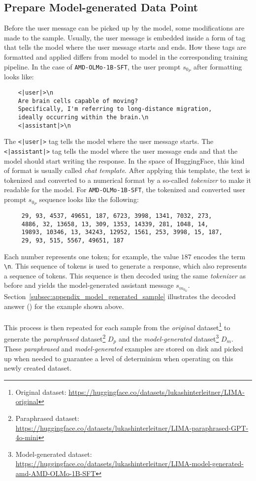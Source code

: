 \subsection{Prepare Model-generated Data Point}\label{subsec:prepare_model_input}
Before the user message can be picked up by the model, some modifications are made to the sample. Usually, the user message is embedded inside a form of tag that tells the model where the user message starts and ends. How these tags are formatted and applied differs from model to model in the corresponding training pipeline. In the case of \texttt{AMD-OLMo-1B-SFT}, the user prompt $s_{0_P}$ after formatting looks like:
\begin{verbatim}
    <|user|>\n
    Are brain cells capable of moving? 
    Specifically, I'm referring to long-distance migration, 
    ideally occurring within the brain.\n
    <|assistant|>\n
\end{verbatim}
The \texttt{<|user|>} tag tells the model where the user message starts. The \texttt{<|assistant|>} tag tells the model where the user message ends and that the model should start writing the response. In the space of HuggingFace, this kind of format is usually called \emph{chat template}. After applying this template, the text is tokenized and converted to a numerical format by a so-called \emph{tokenizer} to make it readable for the model. For \texttt{AMD-OLMo-1B-SFT}, the tokenized and converted user prompt $s_{0_P}$ sequence looks like the following:
\begin{verbatim}
     29, 93, 4537, 49651, 187, 6723, 3998, 1341, 7032, 273,
     4886, 32, 13658, 13, 309, 1353, 14339, 281, 1048, 14,
     19893, 10346, 13, 34243, 12952, 1561, 253, 3998, 15, 187,
     29, 93, 515, 5567, 49651, 187
\end{verbatim}
Each number represents one token; for example, the value $187$ encodes the term \texttt{\textbackslash n}. This sequence of tokens is used to generate a response, which also represents a sequence of tokens. This sequence is then decoded using the same \emph{tokenizer} as before and yields the model-generated assistant message $s_{m_{0_G}}$. Section~\ref{subsec:appendix_model_generated_sample} illustrates the decoded answer () for the example shown above.
\\\\
This process is then repeated for each sample from the \emph{original} dataset\footnote{Original dataset: \url{https://huggingface.co/datasets/lukashinterleitner/LIMA-original}} to generate the \emph{paraphrased} dataset\footnote{Paraphrased dataset: \url{https://huggingface.co/datasets/lukashinterleitner/LIMA-paraphrased-GPT-4o-mini}} $D_p$ and the \emph{model-generated} dataset\footnote{Model-generated dataset: \url{https://huggingface.co/datasets/lukashinterleitner/LIMA-model-generated-amd-AMD-OLMo-1B-SFT}} $D_m$. These \emph{paraphrased} and \emph{model-generated} examples are stored on disk and picked up when needed to guarantee a level of determinism when operating on this newly created dataset.

